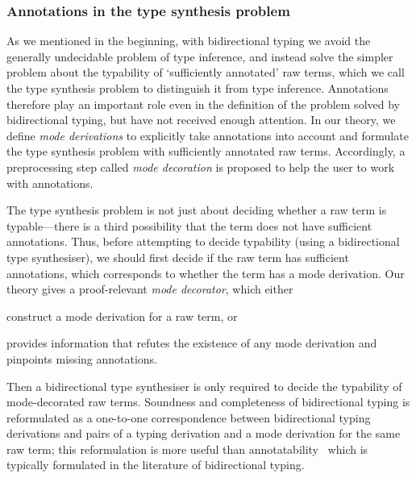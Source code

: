 \subsubsection{Annotations in the type synthesis problem}

As we mentioned in the beginning, with bidirectional typing we avoid the generally undecidable problem of type inference, and instead solve the simpler problem about the typability of `sufficiently annotated' raw terms, which we call the type synthesis problem to distinguish it from type inference.
Annotations therefore play an important role even in the definition of the problem solved by bidirectional typing, but have not received enough attention.
In our theory, we define \emph{mode derivations} to explicitly take annotations into account and formulate the type synthesis problem with sufficiently annotated raw terms.
Accordingly, a preprocessing step called \emph{mode decoration} is proposed to help the user to work with annotations.

The type synthesis problem is not just about deciding whether a raw term is typable---there is a third possibility that the term does not have sufficient annotations.
Thus, before attempting to decide typability (using a bidirectional type synthesiser), we should first decide if the raw term has sufficient annotations, which corresponds to whether the term has a mode derivation.
Our theory gives a proof-relevant \emph{mode decorator}, which either
\begin{inlineenum}
  \item construct a mode derivation for a raw term, or
  \item provides information that refutes the existence of any mode derivation and pinpoints missing annotations.
\end{inlineenum}
Then a bidirectional type synthesiser is only required to decide the typability of mode-decorated raw terms.
Soundness and completeness of bidirectional typing is reformulated as a one-to-one correspondence between bidirectional typing derivations and pairs of a typing derivation and a mode derivation for the same raw term; this reformulation is more useful than annotatability~\cite[Section~3.2]{Dunfield2021} which is typically formulated in the literature of bidirectional typing.


